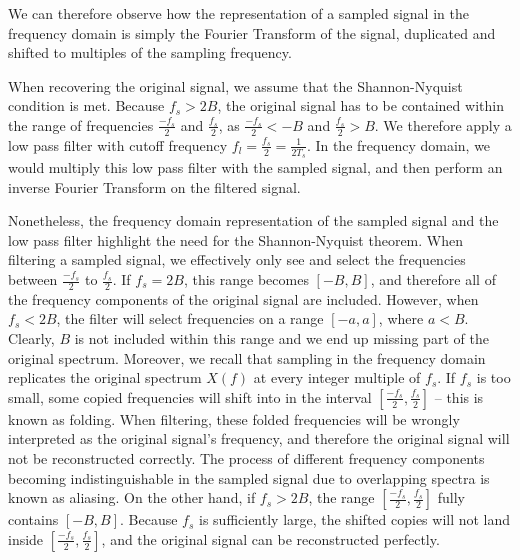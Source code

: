 \documentclass{article}
\begin{document}
We can therefore observe how the representation of a sampled signal in the frequency domain is simply the Fourier Transform of the signal, duplicated and shifted to multiples of the sampling frequency.

When recovering the original signal, we assume that the Shannon-Nyquist condition is met. 
Because $f_s > 2B$, the original signal has to be contained within the range of frequencies $\frac{-f_s}{2}$ and $\frac{f_s}{2}$, as $\frac{-f_s}{2} < -B$ and  $\frac{f_s}{2} > B$. 
We therefore apply a low pass filter with cutoff frequency $f_l = \frac{f_s}{2} = \frac{1}{2T_s}$.
In the frequency domain, we would multiply this low pass filter with the sampled signal, and then perform an inverse Fourier Transform on the filtered signal.

Nonetheless, the frequency domain representation of the sampled signal and the low pass filter highlight the need for the Shannon-Nyquist theorem.
When filtering a sampled signal, we effectively only see and select the frequencies between $\frac{-f_s}{2}$ to $\frac{f_s}{2}$.
If $f_s = 2B$, this range becomes $[-B, B]$, and therefore all of the frequency components of the original signal are included.
However, when $f_s < 2B$, the filter will select frequencies on a range $[-a, a]$, where $a < B$. Clearly, $B$ is not included within this range and we end up missing part of the original spectrum.
Moreover, we recall that sampling in the frequency domain replicates the original spectrum $X(f)$ at every integer multiple of $f_s$.
If $f_s$ is too small, some copied frequencies will shift into in the interval $\left[\frac{-f_s}{2}, \frac{f_s}{2}\right]$ -- this is known as folding.
When filtering, these folded frequencies will be wrongly interpreted as the original signal's frequency, and therefore the original signal will not be reconstructed correctly.
The process of different frequency components becoming indistinguishable in the sampled signal due to overlapping spectra is known as aliasing.
On the other hand, if $f_s > 2B$, the range $\left[\frac{-f_s}{2}, \frac{f_s}{2}\right]$ fully contains $\left[-B, B \right]$. 
Because $f_s$ is sufficiently large, the shifted copies will not land inside $\left[\frac{-f_s}{2}, \frac{f_s}{2}\right]$, and the original signal can be reconstructed perfectly.
\end{document}
